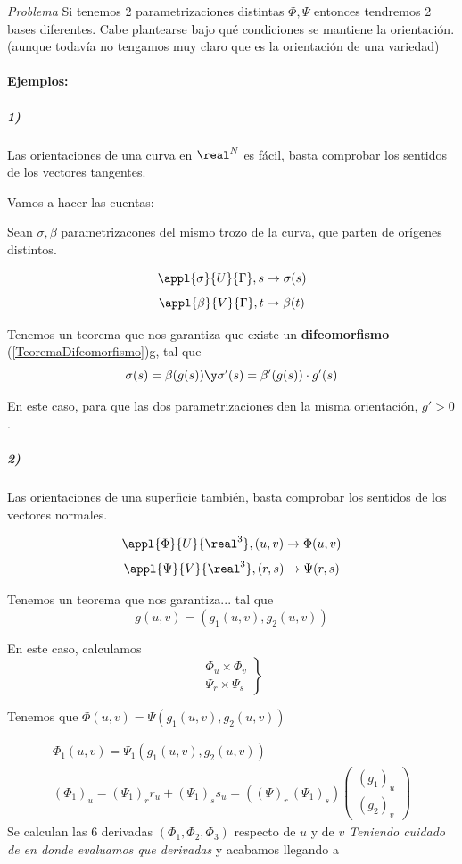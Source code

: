 \textit{Problema} Si tenemos 2 parametrizaciones distintas $\Phi,\Psi$ entonces tendremos 2 bases diferentes. Cabe plantearse bajo qué condiciones se mantiene la orientación. (aunque todavía no tengamos muy claro que es la orientación de una variedad)

\paragraph{Ejemplos:}
\subparagraph{1)} Las orientaciones de una curva en $\real^N$ es fácil, basta comprobar los sentidos de los vectores tangentes.

Vamos a hacer las cuentas:

Sean $\sigma,\beta$ parametrizacones del mismo trozo de la curva, que parten de orígenes distintos.

\[\appl{\sigma}{U}{\Gamma},s\to \sigma(s)\]
\[\appl{\beta}{V}{\Gamma},t\to \beta(t)\]

Tenemos un teorema que nos garantiza que existe un \textbf{difeomorfismo} (\ref{TeoremaDifeomorfismo})g, tal que \[\sigma(s) = \beta(g(s)) \y \sigma'(s) = \beta'(g(s))\cdot g'(s)\]

En este caso, para que las dos parametrizaciones den la misma orientación, $g'>0$.

\subparagraph{2)} Las orientaciones de una superficie también, basta comprobar los sentidos de los vectores normales.

\[\appl{\Phi}{U}{\real^3}, (u,v) \to \Phi(u,v)\]
\[\appl{\Psi}{V}{\real^3}, (r,s) \to \Psi(r,s)\]

Tenemos un teorema que nos garantiza... tal que \[g(u,v) = (g_1(u,v),g_2(u,v))\]

En este caso, calculamos \[\left.\begin{array}{c}
\Phi_u\times\Phi_v \\
\Psi_r\times\Psi_s
\end{array}\right\}\]

Tenemos que $\Phi(u,v) = \Psi(g_1(u,v),g_2(u,v))$

\begin{gather*}
\Phi_1(u,v) = \Psi_1(g_1(u,v),g_2(u,v))\\
(\Phi_1)_{u} = (\Psi_1)_r r_u + (\Psi_1)_s s_u = ((\Psi)_r\,(\Psi_1)_s)\begin{pmatrix}
(g_1)_u\\(g_2)_v
\end{pmatrix}
\end{gather*}
Se calculan las 6 derivadas $(\Phi_1,\Phi_2,\Phi_3)$ respecto de $u$ y de $v$ \emph{Teniendo cuidado de en donde evaluamos que derivadas} y acabamos llegando a

